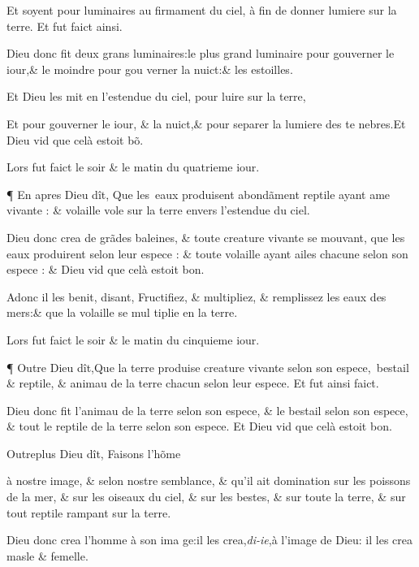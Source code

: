 \bverse Et soyent pour luminaires au firma\-ment
du ciel, à fin de donner lumiere
sur la terre. Et fut faict ainsi.

\bverse Dieu donc fit deux grans luminai\-res:le
 plus grand luminaire pour
\footnotemarkmain{} gouverner le iour,\& le moindre
pour gou \lb
verner la nuict:\& les estoilles.

\bverse Et Dieu les mit en l'estendue du ciel,
pour luire sur la terre,

\bverse Et pour gouverner le iour, \& la
nuict,\& pour separer la lumiere des te \lb
nebres.Et Dieu vid que celà estoit b\~o.

\bverse Lors fut faict le soir \& le matin du
quatrieme iour.

\bverse ¶ En apres Dieu dît, Que les~eaux
produisent abond\~ament
\footnotemarkmain{}reptile ayant ame
vivante : \& volaille vole sur la ter\-re
envers l'estendue du ciel.

\bverse Dieu donc
\footnotemarkmain{}crea de gr\~ades baleines,
\& toute creature vivante se mouvant,
que les eaux produirent selon leur es\-pece :
\& toute volaille ayant ailes chacune selon son espece : 
\& Dieu vid \lb
 que celà estoit bon.

\bverse Adonc \footnotemarkmain{}il les benit, disant, Fructi\-fiez,
\& multipliez, \& remplissez les
eaux des mers:\& que la volaille se mul \lb
tiplie en la terre.

\bverse Lors fut faict le soir \& le matin du
cinquieme iour.

\bverse ¶ Outre Dieu dît,Que la terre produise
creature vivante selon son espe\-ce,~bestail
 \& reptile, \& animau de la
terre chacun selon leur espece. Et fut
ainsi faict.

\bverse Dieu donc fit l'animau de la terre
selon son espece, \& le bestail selon son
espece, \& tout le reptile de la terre se\-lon
son espece. Et Dieu vid que celà
estoit bon.

\bverse Outreplus Dieu dît,
\footnotemarkmain{}Faisons
\footnotemarkmain{}l'h\~o\-me
\addtocounter{footnotemain}{1}%
à \footnotemarkverse{}\footnotemarkmain{} nostre image,
\& selon nostre
semblance, \& qu'il ait domination sur
les poissons de la mer, \& sur les oi\-seaux
du ciel, \& sur les bestes, \& sur
toute la terre, \& sur tout reptile ram\-pant
sur la terre.
\addtocounter{footnotemain}{1}%

\bverse Dieu donc crea l'homme à son ima \lb
ge:\footnotemarkverse{}\footnotemarkmain{}il les
crea,\emph{di-ie},à l'image de Dieu:
\footnotemarkverse{}il les crea masle \& femelle.

